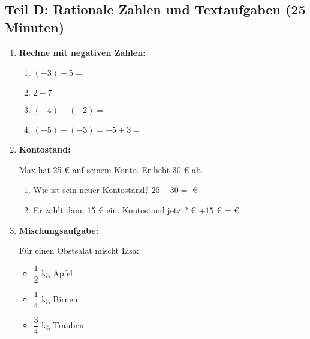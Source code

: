 \subsection*{Teil D: Rationale Zahlen und Textaufgaben (25 Minuten)}

\begin{enumerate}[resume, label=\arabic*.]
    \item \textbf{Rechne mit negativen Zahlen:}

    \begin{enumerate}[label=\alph*)]
        \item $(-3) + 5 = $ \underline{\hspace{3cm}}
        \item $2 - 7 = $ \underline{\hspace{3cm}}
        \item $(-4) + (-2) = $ \underline{\hspace{3cm}}
        \item $(-5) - (-3) = -5 + 3 = $ \underline{\hspace{3cm}}
    \end{enumerate}

    \vspace{0.5cm}

    \item \textbf{Kontostand:}

    Max hat 25 € auf seinem Konto. Er hebt 30 € ab.

    \begin{enumerate}[label=\alph*)]
        \item Wie ist sein neuer Kontostand? 
        $25 - 30 = $ \underline{\hspace{3cm}} €

        \item Er zahlt dann 15 € ein. Kontostand jetzt? 
        \underline{\hspace{2cm}} € $+ 15$ € = \underline{\hspace{3cm}} €
    \end{enumerate}

    \vspace{0.5cm}

    \item \textbf{Mischungsaufgabe:}

    Für einen Obstsalat mischt Lisa:
    \begin{itemize}
        \item $\dfrac{1}{2}$ kg Äpfel
        \item $\dfrac{1}{4}$ kg Birnen  
        \item $\dfrac{3}{4}$ kg Trauben
    \end{itemize}


\end{enumerate}
